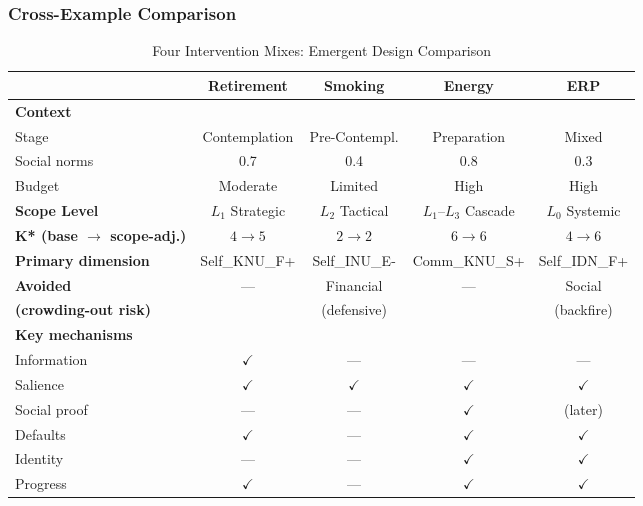 
\subsubsection{Cross-Example Comparison}
\label{subsubsec:comparison}

\begin{table}[htbp]
\centering
\caption{Four Intervention Mixes: Emergent Design Comparison}
\label{tab:intervention-comparison}
\small
\renewcommand{\arraystretch}{1.2}
\begin{tabular}{@{}lcccc@{}}
\toprule
& \textbf{Retirement} & \textbf{Smoking} & \textbf{Energy} & \textbf{ERP} \\
\midrule
\textbf{Context} & & & & \\
\quad Stage & Contemplation & Pre-Contempl. & Preparation & Mixed \\
\quad Social norms & 0.7 & 0.4 & 0.8 & 0.3 \\
\quad Budget & Moderate & Limited & High & High \\
\quad \textbf{Scope Level} & $L_1$ Strategic & $L_2$ Tactical & $L_1$--$L_3$ Cascade & $L_0$ Systemic \\
\midrule
\textbf{K* (base $\to$ scope-adj.)} & $4 \to 5$ & $2 \to 2$ & $6 \to 6$ & $4 \to 6$ \\
\midrule
\textbf{Primary dimension} & Self\_KNU\_F+ & Self\_INU\_E- & Comm\_KNU\_S+ & Self\_IDN\_F+ \\
\midrule
\textbf{Avoided} & --- & Financial & --- & Social \\
\textbf{(crowding-out risk)} & & (defensive) & & (backfire) \\
\midrule
\textbf{Key mechanisms} & & & & \\
\quad Information & $\checkmark$ & --- & --- & --- \\
\quad Salience & $\checkmark$ & $\checkmark$ & $\checkmark$ & $\checkmark$ \\
\quad Social proof & --- & --- & $\checkmark$ & (later) \\
\quad Defaults & $\checkmark$ & --- & $\checkmark$ & $\checkmark$ \\
\quad Identity & --- & --- & $\checkmark$ & $\checkmark$ \\
\quad Progress & $\checkmark$ & --- & $\checkmark$ & $\checkmark$ \\
\bottomrule
\end{tabular}
\end{table}

